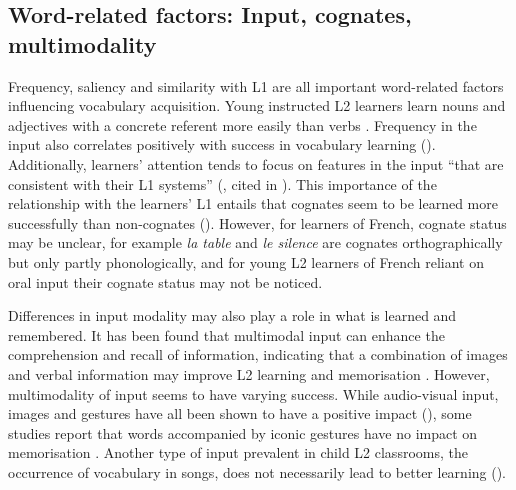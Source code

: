 \documentclass[output=paper]{langscibook}
\begin{document}
\subsection{Word-related factors: Input, cognates, multimodality}

Frequency, saliency and similarity with L1 are all important word-related factors influencing vocabulary acquisition. Young instructed L2 learners learn nouns and adjectives with a concrete referent more easily than verbs \citep{CableEtAl2010}. Frequency in the input also correlates positively with success in vocabulary learning (\citealt{Szpotowicz2009,VanZeelandSchmitt2013,PetersWebb2018,DeWildeEtAl2021}). Additionally, learners’ attention tends to focus on features in the input ``that are consistent with their L1 systems'' (\citealt{Ellis2006}, cited in \citealt[214]{Kormos2020}). This importance of the relationship with the learners’ L1 entails that cognates seem to be learned more successfully than non-cognates (\citealt{Szpotowicz2009,PetersWebb2018,DeWildeEtAl2021}). However, for learners of French, cognate status may be unclear, for example \textit{la table} and \textit{le silence} are cognates orthographically but only partly phonologically, and for young L2 learners of French reliant on oral input their cognate status may not be noticed.

Differences in input modality may also play a role in what is learned and remembered. It has been found that multimodal input can enhance the comprehension and recall of information, indicating that a combination of images and verbal information may improve L2 learning and memorisation \citep{Syodorenko2010}. However, multimodality of input seems to have varying success. While audio-visual input, images and gestures have all been shown to have a positive impact (\citealt{Allen1995,Tellier2008,KellyEtAl2009,Porter2016,MuñozEtAl2021}), some studies report that words accompanied by iconic gestures have no impact on memorisation \citep{MorettEtAl2012}. Another type of input prevalent in child L2 classrooms, the occurrence of vocabulary in songs, does not necessarily lead to better learning (\citealt{CoyleGómezGracia2014,RuleMitchell2014}).
\end{document}
